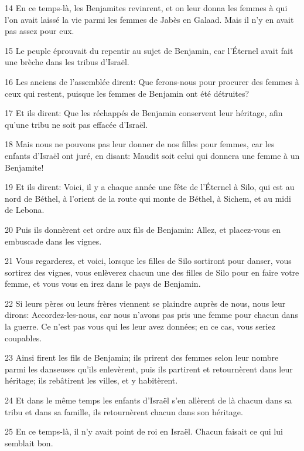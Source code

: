 \par 14 En ce temps-là, les Benjamites revinrent, et on leur donna les femmes à qui l'on avait laissé la vie parmi les femmes de Jabès en Galaad. Mais il n'y en avait pas assez pour eux.
\par 15 Le peuple éprouvait du repentir au sujet de Benjamin, car l'Éternel avait fait une brèche dans les tribus d'Israël.
\par 16 Les anciens de l'assemblée dirent: Que ferons-nous pour procurer des femmes à ceux qui restent, puisque les femmes de Benjamin ont été détruites?
\par 17 Et ils dirent: Que les réchappés de Benjamin conservent leur héritage, afin qu'une tribu ne soit pas effacée d'Israël.
\par 18 Mais nous ne pouvons pas leur donner de nos filles pour femmes, car les enfants d'Israël ont juré, en disant: Maudit soit celui qui donnera une femme à un Benjamite!
\par 19 Et ils dirent: Voici, il y a chaque année une fête de l'Éternel à Silo, qui est au nord de Béthel, à l'orient de la route qui monte de Béthel, à Sichem, et au midi de Lebona.
\par 20 Puis ils donnèrent cet ordre aux fils de Benjamin: Allez, et placez-vous en embuscade dans les vignes.
\par 21 Vous regarderez, et voici, lorsque les filles de Silo sortiront pour danser, vous sortirez des vignes, vous enlèverez chacun une des filles de Silo pour en faire votre femme, et vous vous en irez dans le pays de Benjamin.
\par 22 Si leurs pères ou leurs frères viennent se plaindre auprès de nous, nous leur dirons: Accordez-les-nous, car nous n'avons pas pris une femme pour chacun dans la guerre. Ce n'est pas vous qui les leur avez données; en ce cas, vous seriez coupables.
\par 23 Ainsi firent les fils de Benjamin; ils prirent des femmes selon leur nombre parmi les danseuses qu'ils enlevèrent, puis ils partirent et retournèrent dans leur héritage; ils rebâtirent les villes, et y habitèrent.
\par 24 Et dans le même temps les enfants d'Israël s'en allèrent de là chacun dans sa tribu et dans sa famille, ils retournèrent chacun dans son héritage.
\par 25 En ce temps-là, il n'y avait point de roi en Israël. Chacun faisait ce qui lui semblait bon.


